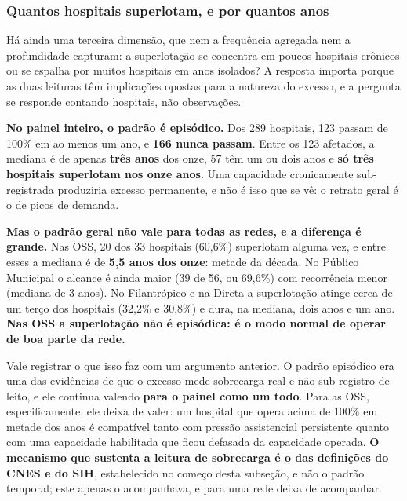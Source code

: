 \subsubsection*{Quantos hospitais superlotam, e por quantos anos}

Há ainda uma terceira dimensão, que nem a frequência agregada nem a
profundidade capturam: a superlotação se concentra em poucos hospitais
crônicos ou se espalha por muitos hospitais em anos isolados? A resposta
importa porque as duas leituras têm implicações opostas para a natureza do
excesso, e a pergunta se responde contando hospitais, não observações.

\textbf{No painel inteiro, o padrão é episódico.} Dos 289 hospitais, 123
passam de 100\% em ao menos um ano, e \textbf{166 nunca passam}. Entre os
123 afetados, a mediana é de apenas \textbf{três anos} dos onze, 57 têm um
ou dois anos e \textbf{só três hospitais superlotam nos onze anos}. Uma
capacidade cronicamente sub-registrada produziria excesso permanente, e não
é isso que se vê: o retrato geral é o de picos de demanda.

\textbf{Mas o padrão geral não vale para todas as redes, e a diferença é
grande.} Nas OSS, 20 dos 33 hospitais (60,6\%) superlotam alguma vez, e
entre esses a mediana é de \textbf{5,5 anos dos onze}: metade da década.
No Público Municipal o alcance é ainda maior (39 de 56, ou 69,6\%) com
recorrência menor (mediana de 3 anos). No Filantrópico e na Direta a
superlotação atinge cerca de um terço dos hospitais (32,2\% e 30,8\%) e
dura, na mediana, dois anos e um ano. \textbf{Nas OSS a superlotação não é
episódica: é o modo normal de operar de boa parte da rede.}

Vale registrar o que isso faz com um argumento anterior. O padrão episódico
era uma das evidências de que o excesso mede sobrecarga real e não
sub-registro de leito, e ele continua valendo \textbf{para o painel como um
todo}. Para as OSS, especificamente, ele deixa de valer: um hospital que
opera acima de 100\% em metade dos anos é compatível tanto com pressão
assistencial persistente quanto com uma capacidade habilitada que ficou
defasada da capacidade operada. \textbf{O mecanismo que sustenta a leitura de
sobrecarga é o das definições do CNES e do SIH}, estabelecido no começo desta
subseção, e não o padrão temporal; este apenas o acompanhava, e para uma rede
deixa de acompanhar.


